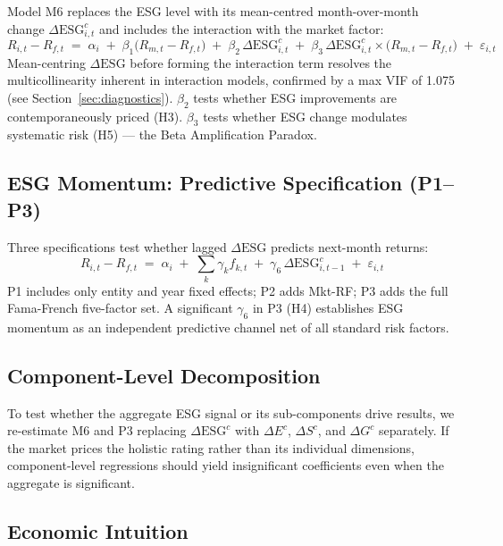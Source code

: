 Model M6 replaces the ESG level with its mean-centred month-over-month change $\Delta\mathrm{ESG}_{i,t}^c$ and includes the interaction with the market factor:
\begin{equation}
  R_{i,t} - R_{f,t} \;=\; \alpha_i \;+\; \beta_1\bigl(R_{m,t}-R_{f,t}\bigr) \;+\; \beta_2\,\Delta\mathrm{ESG}_{i,t}^c \;+\; \beta_3\,\Delta\mathrm{ESG}_{i,t}^c\times\bigl(R_{m,t}-R_{f,t}\bigr) \;+\; \varepsilon_{i,t}
  \label{eq:m6}
\end{equation}
Mean-centring $\Delta\mathrm{ESG}$ before forming the interaction term resolves the multicollinearity inherent in interaction models, confirmed by a max VIF of 1.075 (see Section~\ref{sec:diagnostics}). $\beta_2$ tests whether ESG improvements are contemporaneously priced (H3). $\beta_3$ tests whether ESG change modulates systematic risk (H5) --- the Beta Amplification Paradox.

\subsection{ESG Momentum: Predictive Specification (P1--P3)}

Three specifications test whether lagged $\Delta\mathrm{ESG}$ predicts next-month returns:
\begin{equation}
  R_{i,t} - R_{f,t} \;=\; \alpha_i \;+\; \sum_{k}\gamma_k f_{k,t} \;+\; \gamma_6\,\Delta\mathrm{ESG}_{i,t-1}^c \;+\; \varepsilon_{i,t}
  \label{eq:momentum}
\end{equation}
P1 includes only entity and year fixed effects; P2 adds Mkt-RF; P3 adds the full Fama-French five-factor set. A significant $\gamma_6$ in P3 (H4) establishes ESG momentum as an independent predictive channel net of all standard risk factors.

\subsection{Component-Level Decomposition}

To test whether the aggregate ESG signal or its sub-components drive results, we re-estimate M6 and P3 replacing $\Delta\mathrm{ESG}^c$ with $\Delta E^c$, $\Delta S^c$, and $\Delta G^c$ separately. If the market prices the holistic rating rather than its individual dimensions, component-level regressions should yield insignificant coefficients even when the aggregate is significant.

\subsection{Economic Intuition}

